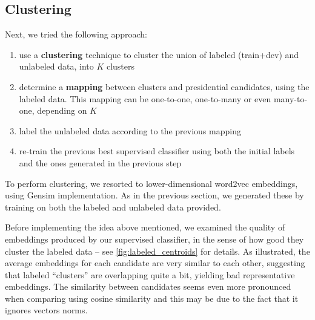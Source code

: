 \documentclass[11pt]{article}
\begin{document}
\subsection{Clustering}\label{subsec:clustering}

Next, we tried the following approach:

\begin{enumerate}
  \item use a \textbf{clustering} technique to cluster the union of labeled (train+dev) and unlabeled data, into $K$ clusters
  \item determine a \textbf{mapping} between clusters and presidential candidates, using the labeled data. This mapping can be one-to-one, one-to-many or even many-to-one, depending on $K$
  \item label the unlabeled data according to the previous mapping 
  \item re-train the previous best supervised classifier using both the initial labels and the ones generated in the previous step
\end{enumerate}

To perform clustering, we resorted to lower-dimensional word2vec embeddings, using Gensim implementation. As in the previous section, we generated these by training on both the labeled and unlabeled data provided.

Before implementing the idea above mentioned, we examined the quality of embeddings produced by our supervised classifier, in the sense of how good they cluster the labeled data -- see \cref{fig:labeled_centroids} for details. As illustrated, the average embeddings for each candidate are very similar to each other, suggesting that labeled ``clusters'' are overlapping quite a bit, yielding bad representative embeddings. The similarity between candidates seems even more pronounced when comparing using cosine similarity and this may be due to the fact that it ignores vectors norms.
\end{document}
